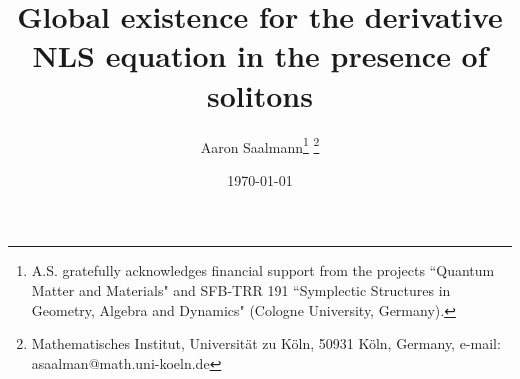 \documentclass[11pt,a4paper]{article}
\theoremstyle{definition}
\theoremstyle{remark}
\numberwithin{equation}{section}
\begin{document}
\title{Global existence for the derivative NLS equation in the presence of solitons}
\author{Aaron Saalmann\thanks{A.S. gratefully acknowledges financial support from the projects ``Quantum Matter and Materials"
and SFB-TRR 191 ``Symplectic Structures in Geometry, Algebra and Dynamics" (Cologne University, Germany).}
\footnote{Mathematisches Institut, Universit\"{a}t zu K\"{o}ln, 50931 K\"{o}ln, Germany, e-mail: asaalman@math.uni-koeln.de}
}

\date{\today}
\maketitle

\tableofcontents
\newpage









\end{document}

